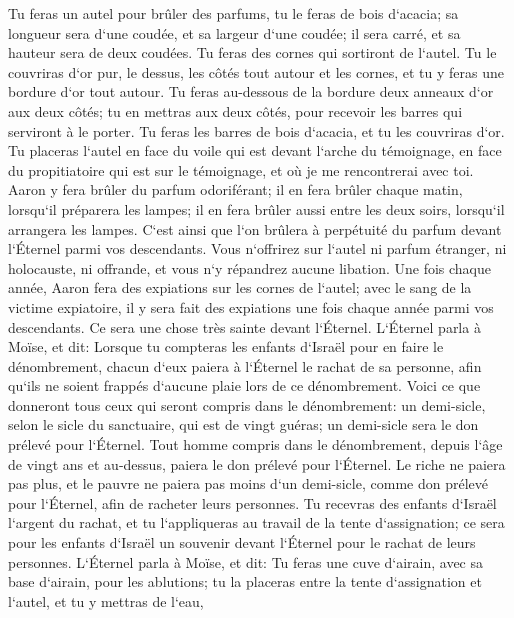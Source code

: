 \verse Tu feras un autel pour brûler des parfums, tu le feras de bois d`acacia; 
\verse sa longueur sera d`une coudée, et sa largeur d`une coudée; il sera carré, et sa hauteur sera de deux coudées. Tu feras des cornes qui sortiront de l`autel. 
\verse Tu le couvriras d`or pur, le dessus, les côtés tout autour et les cornes, et tu y feras une bordure d`or tout autour. 
\verse Tu feras au-dessous de la bordure deux anneaux d`or aux deux côtés; tu en mettras aux deux côtés, pour recevoir les barres qui serviront à le porter. 
\verse Tu feras les barres de bois d`acacia, et tu les couvriras d`or. 
\verse Tu placeras l`autel en face du voile qui est devant l`arche du témoignage, en face du propitiatoire qui est sur le témoignage, et où je me rencontrerai avec toi. 
\verse Aaron y fera brûler du parfum odoriférant; il en fera brûler chaque matin, lorsqu`il préparera les lampes; 
\verse il en fera brûler aussi entre les deux soirs, lorsqu`il arrangera les lampes. C`est ainsi que l`on brûlera à perpétuité du parfum devant l`Éternel parmi vos descendants. 
\verse Vous n`offrirez sur l`autel ni parfum étranger, ni holocauste, ni offrande, et vous n`y répandrez aucune libation. 
\verse Une fois chaque année, Aaron fera des expiations sur les cornes de l`autel; avec le sang de la victime expiatoire, il y sera fait des expiations une fois chaque année parmi vos descendants. Ce sera une chose très sainte devant l`Éternel. 
\verse L`Éternel parla à Moïse, et dit: 
\verse Lorsque tu compteras les enfants d`Israël pour en faire le dénombrement, chacun d`eux paiera à l`Éternel le rachat de sa personne, afin qu`ils ne soient frappés d`aucune plaie lors de ce dénombrement. 
\verse Voici ce que donneront tous ceux qui seront compris dans le dénombrement: un demi-sicle, selon le sicle du sanctuaire, qui est de vingt guéras; un demi-sicle sera le don prélevé pour l`Éternel. 
\verse Tout homme compris dans le dénombrement, depuis l`âge de vingt ans et au-dessus, paiera le don prélevé pour l`Éternel. 
\verse Le riche ne paiera pas plus, et le pauvre ne paiera pas moins d`un demi-sicle, comme don prélevé pour l`Éternel, afin de racheter leurs personnes. 
\verse Tu recevras des enfants d`Israël l`argent du rachat, et tu l`appliqueras au travail de la tente d`assignation; ce sera pour les enfants d`Israël un souvenir devant l`Éternel pour le rachat de leurs personnes. 
\verse L`Éternel parla à Moïse, et dit: 
\verse Tu feras une cuve d`airain, avec sa base d`airain, pour les ablutions; tu la placeras entre la tente d`assignation et l`autel, et tu y mettras de l`eau, 
